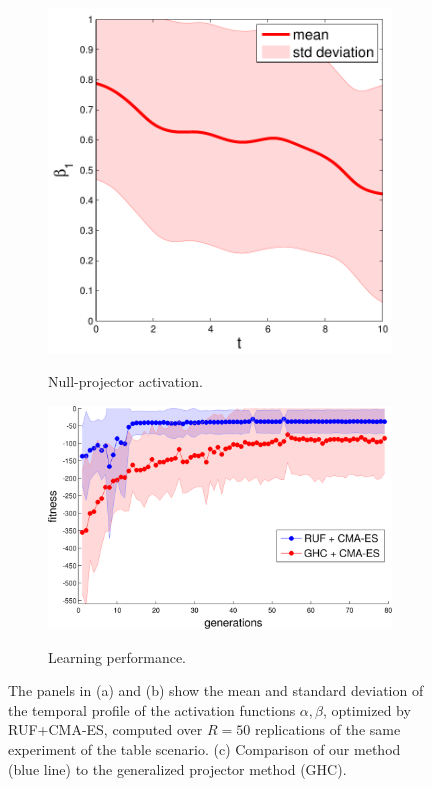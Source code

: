 \begin{figure}
\begin{subfigure}{.3\textwidth}
  \includegraphics[width=1\linewidth]{./sections/WP4/pics_serena/alpha2}
  \label{fig:alpha2}
  \caption{Null-projector activation.}
\end{subfigure}
\begin{subfigure}{.38\textwidth}
  \centering
  \includegraphics[width=1\linewidth]{./sections/WP4/pics_serena/comparison}
  \label{fig:alpha2}
  \caption{Learning performance.}
\end{subfigure}
\caption{The panels in (a) and (b) show the mean and standard deviation of the temporal
profile of the activation functions $\alpha,\beta$, optimized by RUF+CMA-ES,
computed over $R=50$ replications of the same experiment of the table scenario.
(c) Comparison of our method (blue line) to the generalized projector method (GHC).}
\label{fig:activation_policy}
\end{figure}


